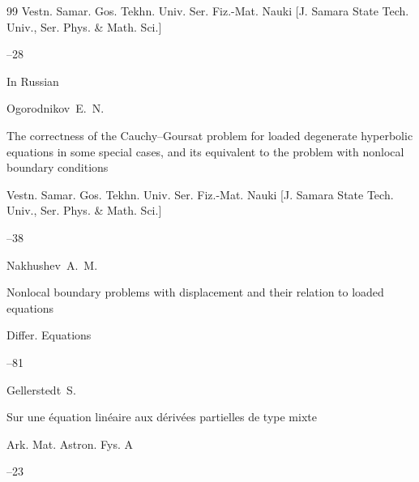 \begin{thebibliography}{99}
\jour Vestn. Samar. Gos. Tekhn. Univ. Ser. Fiz.-Mat. Nauki \rm [J. Samara State Tech. Univ., Ser. Phys. \& Math. Sci.]



--28





\lang In Russian

\by Ogorodnikov~E.~N.

\paper The correctness of the Cauchy--Goursat problem for loaded degenerate hyperbolic equations  in some special cases, and its equivalent to the problem with nonlocal boundary conditions

\jour Vestn. Samar. Gos. Tekhn. Univ. Ser. Fiz.-Mat. Nauki \rm [J. Samara State Tech. Univ., Ser. Phys. \& Math. Sci.]



--38





\by Nakhushev~A.~M.

\paper Nonlocal boundary problems with displacement and their relation to loaded equations

\jour Differ. Equations



--81 







\by Gellerstedt~S.

\paper Sur une \'equation lin\'eaire aux d\'eriv\'ees partielles de type mixte

\jour Ark. Mat. Astron. Fys. A 




--23





\end{thebibliography}
